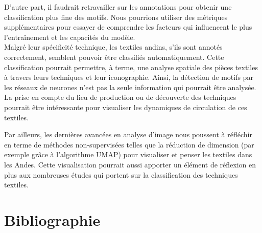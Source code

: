 \documentclass[a4paper, twoside, 12pt]{book}
\begin{document}
D'autre part, il faudrait retravailler sur les annotations pour obtenir une classification plus fine des motifs. Nous pourrions utiliser des métriques supplémentaires pour essayer de comprendre les facteurs qui influencent le plus l'entraînement et les capacités du modèle. \\

Malgré leur spécificité technique, les textiles andins, s'ils sont annotés correctement, semblent pouvoir être classifiés automatiquement. Cette classification pourrait permettre, à terme, une analyse spatiale des pièces textiles à travers leurs techniques et leur iconographie. Ainsi, la détection de motifs par les réseaux de neurones n'est pas la seule information qui pourrait être analysée. La prise en compte du lieu de production ou de découverte des techniques pourrait être intéressante pour visualiser les dynamiques de circulation de ces textiles. 

Par ailleurs, les dernières avancées en analyse d'image nous poussent à réfléchir en terme de méthodes non-supervisées telles que la réduction de dimension (par exemple grâce à l'algorithme UMAP) pour visualiser et penser les textiles dans les Andes. Cette visualisation pourrait aussi apporter un élément de réflexion en plus aux nombreuses études qui portent sur la classification des techniques textiles.

\listoffigures

\clearpage 

\chapter*{Bibliographie}

\printbibliography[heading=subbibintoc,keyword=TextAnd,title=Textiles]
\printbibliography[heading=subbibintoc, keyword=textnum,title=Humanités Numériques]
\printbibliography[heading=subbibintoc, title=Sitographie, type=online]
\end{document}
